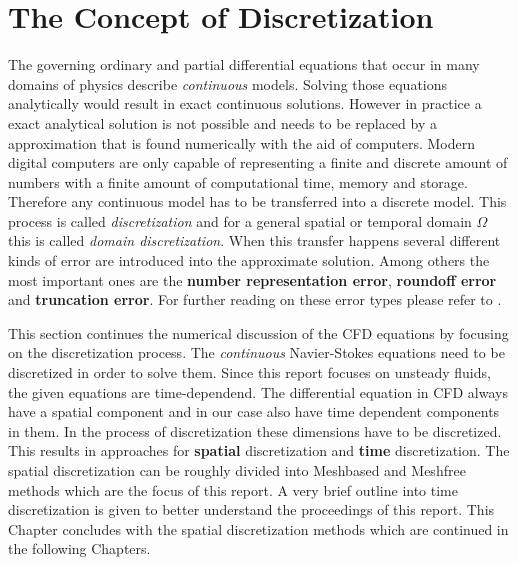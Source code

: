 


 








\section{ The Concept of Discretization } \label{sec:Discretization}

The governing ordinary and partial differential equations that occur in many domains of physics describe
\emph{continuous} models. Solving those equations analytically would result in exact continuous solutions. However in practice
a exact analytical solution is not possible and needs to be replaced by a approximation that is found numerically with the aid of computers.
Modern digital computers are only capable of representing a finite and discrete amount of numbers with a finite amount of computational time, memory and storage.
Therefore any continuous model has to be transferred into a discrete model. This process is called \emph{discretization} and for a general spatial or temporal domain $ \Omega $ this is called \emph{domain discretization}. When this transfer happens several different kinds
of error are introduced into the approximate solution. Among others the most important ones are the \textbf{number representation error}, \textbf{roundoff error} and \textbf{truncation error}. For further reading on these error types please refer to \citep[pg.8]{Press2007}.

This section continues the numerical discussion of the CFD equations by focusing on the discretization process. The \emph{continuous} Navier-Stokes equations need to be 
discretized in order to solve them. Since this report focuses on unsteady fluids, the given equations are time-dependend. The differential equation in CFD always have a spatial component and in our case also have time dependent components in them. In the process of discretization these dimensions have to be discretized. This results in approaches for \textbf{spatial} discretization and \textbf{time} discretization. The spatial discretization can be roughly divided into Meshbased and Meshfree methods which are the focus of this report. A very brief outline into time discretization is given to better understand the proceedings of this report.  This Chapter concludes with the spatial discretization methods which are continued in the following Chapters. 


